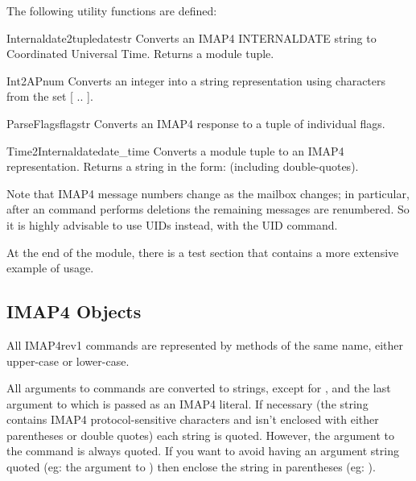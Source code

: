 The following utility functions are defined:

\begin{funcdesc}{Internaldate2tuple}{datestr}
  Converts an IMAP4 INTERNALDATE string to Coordinated Universal
  Time. Returns a  module tuple.
\end{funcdesc}

\begin{funcdesc}{Int2AP}{num}
  Converts an integer into a string representation using characters
  from the set [ .. ].
\end{funcdesc}

\begin{funcdesc}{ParseFlags}{flagstr}
  Converts an IMAP4  response to a tuple of individual
  flags.
\end{funcdesc}

\begin{funcdesc}{Time2Internaldate}{date_time}
  Converts a  module tuple to an IMAP4
   representation.  Returns a string in the form:
   (including double-quotes).
\end{funcdesc}


Note that IMAP4 message numbers change as the mailbox changes; in
particular, after an  command performs deletions the
remaining messages are renumbered. So it is highly advisable to use
UIDs instead, with the UID command.

At the end of the module, there is a test section that contains a more
extensive example of usage.

\begin{seealso}
\end{seealso}


\subsection{IMAP4 Objects \label{imap4-objects}}

All IMAP4rev1 commands are represented by methods of the same name,
either upper-case or lower-case.

All arguments to commands are converted to strings, except for
, and the last argument to  which is
passed as an IMAP4 literal.  If necessary (the string contains IMAP4
protocol-sensitive characters and isn't enclosed with either
parentheses or double quotes) each string is quoted. However, the
 argument to the  command is always quoted.
If you want to avoid having an argument string quoted
(eg: the  argument to ) then enclose the string in
parentheses (eg: ).


